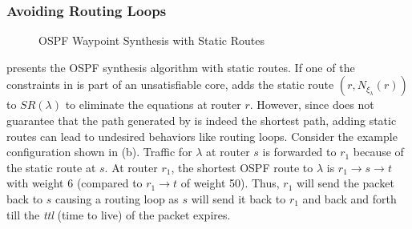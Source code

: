 \subsubsection{Avoiding Routing Loops} \label{sec:loopavoidance}
\begin{wrapfigure}{r}{0.5\textwidth}
	\vspace{-7mm}
	\begin{minipage}{\linewidth}
		\begin{algorithm}[H]
			\begin{footnotesize} 
				\caption{OSPF Waypoint Synthesis with Static Routes}
				\label{alg:wayptunsat}
				\begin{algorithmic}[1]
					\EndWhile
					\EndProcedure
				\end{algorithmic}
			\end{footnotesize}
		\end{algorithm}
	\end{minipage}
\end{wrapfigure}
 presents the OSPF 
synthesis algorithm with static routes.  
If one of the constraints in  is part of an unsatisfiable  
core, \name adds the static route $(r, N_{\xi_\lambda}(r))$ to
$SR(\lambda)$ to eliminate the equations at router $r$. 
However, since  does not guarantee that the path generated
by \genesis is indeed the shortest path, adding
static routes can lead to undesired behaviors like routing loops.  
Consider the example configuration shown in (b). 
Traffic for $\lambda$ at router $s$ is forwarded to $r_1$ because of the
static route at $s$. At router $r_1$, the shortest OSPF route to
$\lambda$ is $r_1 \rightarrow s \rightarrow t$ with weight 6 (compared 
to $r_1 \rightarrow t$ of weight 50). Thus, $r_1$ will send the 
packet back to $s$  causing a routing loop as $s$ will send
it back to $r_1$ and back and forth till the \emph{ttl} (time to live) of the
packet expires. 


